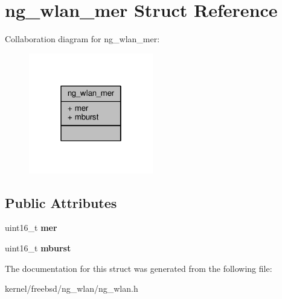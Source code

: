 \hypertarget{structng__wlan__mer}{\section{ng\+\_\+wlan\+\_\+mer Struct Reference}
\label{structng__wlan__mer}
}


Collaboration diagram for ng\+\_\+wlan\+\_\+mer\+:
\nopagebreak
\begin{figure}[H]
\begin{center}
\leavevmode
\includegraphics[width=154pt]{structng__wlan__mer__coll__graph}
\end{center}
\end{figure}
\subsection*{Public Attributes}
\begin{DoxyCompactItemize}
\item 
\hypertarget{structng__wlan__mer_a8bfecb8272448bffc9d385487fa1ff97}{uint16\+\_\+t {\bfseries mer}}\label{structng__wlan__mer_a8bfecb8272448bffc9d385487fa1ff97}

\item 
\hypertarget{structng__wlan__mer_ae3d904628ae46b61a5f7fece8ee71075}{uint16\+\_\+t {\bfseries mburst}}\label{structng__wlan__mer_ae3d904628ae46b61a5f7fece8ee71075}

\end{DoxyCompactItemize}


The documentation for this struct was generated from the following file\+:\begin{DoxyCompactItemize}
\item 
kernel/freebsd/ng\+\_\+wlan/ng\+\_\+wlan.\+h\end{DoxyCompactItemize}
